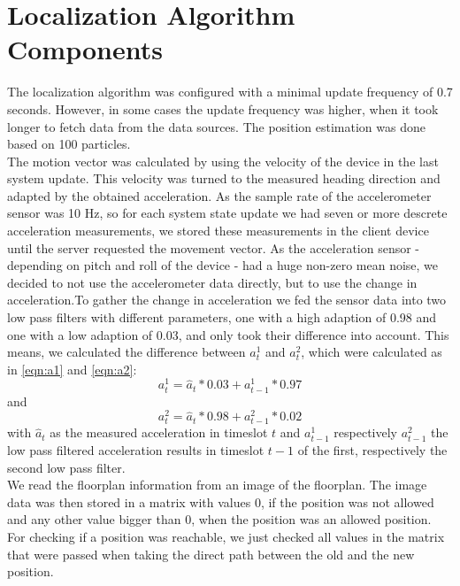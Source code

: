 \section{Localization Algorithm Components}
The localization algorithm was configured with a minimal update frequency of 0.7 seconds. However, in some cases the update frequency was higher, when it took longer to fetch data from the data sources. The position estimation was done based on 100 particles.\\
\noindent\hspace*{5mm}%
The motion vector was calculated by using the velocity of the device in the last system update. This velocity was turned to the measured heading direction and adapted by the obtained acceleration.  As the sample rate of the accelerometer sensor was 10 Hz, so for each system state update we had seven or more descrete acceleration measurements, we stored these measurements in the client device until the server requested the movement vector. As the acceleration sensor - depending on pitch and roll of the device - had a huge non-zero mean noise, we decided to not use the accelerometer data directly, but to use the change in acceleration.To gather the change in acceleration we fed the sensor data into two low pass filters with different parameters, one with a high adaption of 0.98 and one with a low adaption of 0.03, and only took their difference into account. This means, we calculated the difference between $a_{t}^1$ and $a_{t}^2$, which were calculated as in \ref{eqn:a1} and \ref{eqn:a2}:
\begin{equation}
a_{t}^{1} = \hat{a}_{t}*0.03 + a_{t-1}^{1} * 0.97
\label{eqn:a1}
\end{equation}
and
\begin{equation}
a_{t}^{2} = \hat{a}_{t}*0.98 + a_{t-1}^{2} * 0.02
\label{eqn:a2}
\end{equation}
with $\hat{a}_{t}$ as the measured acceleration in timeslot $t$ and $a_{t-1}^{1}$ respectively $a_{t-1}^{2}$ the low pass filtered acceleration results in timeslot $t-1$ of the first, respectively the second low pass filter.\\
\noindent\hspace*{5mm}%
We read the floorplan information from an image of the floorplan. The image data was then stored in a matrix with values 0, if the position was not allowed and any other value bigger than 0, when the position was an allowed position. For checking if a position was reachable, we just checked all values in the matrix that were passed when taking the direct path between the old and the new position.\\
